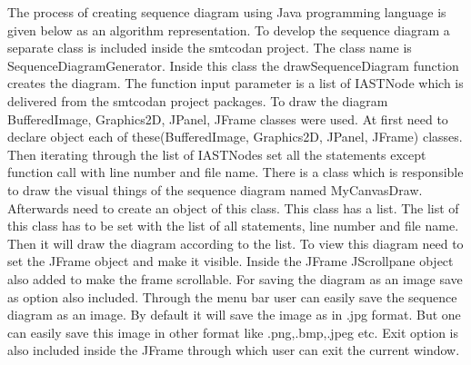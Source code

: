 The process of creating sequence diagram using Java programming language is given below as an algorithm representation. To develop the sequence diagram a separate class is included inside the smtcodan project. The class name is SequenceDiagramGenerator. Inside this class the drawSequenceDiagram function creates the diagram. The function input parameter is a list of IASTNode which is delivered from the smtcodan project packages. To draw the diagram BufferedImage, Graphics2D, JPanel, JFrame  classes were used. At first need to declare object each of these(BufferedImage, Graphics2D, JPanel, JFrame) classes. Then iterating through the list of IASTNodes set all the statements except function call with line number and file name. There is a class which is responsible to draw the visual things of the sequence diagram named MyCanvasDraw. Afterwards need to create an object of this class. This class has a list. The list of this class has to be set with the list of all statements, line number  and file name. Then it will draw the diagram according to the list. To view this diagram need to set the JFrame object and make it visible. Inside the JFrame JScrollpane object also added to make the frame scrollable. For saving the diagram as an image save as option also included. Through the menu bar user can easily save the sequence diagram as an image. By default it will save the image as in .jpg format. But one can easily save this image in other format like .png,.bmp,.jpeg etc. Exit option is also included inside the JFrame through which user can exit the current window.  


